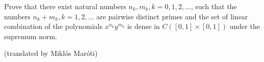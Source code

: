 Prove that there exist natural numbers $n_k, m_k, k=0,1,2,\ldots$, such that the numbers $n_k+m_k, k=1,2,\ldots$ are pairwise distinct primes and the set of linear combination of the polynomials $x^{n_k}y^{m_k}$ is dense in $C([0,1] \times [0,1])$ under the supremum norm.

(translated by Miklós Maróti)
